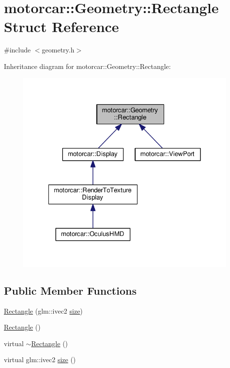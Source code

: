 \hypertarget{structmotorcar_1_1Geometry_1_1Rectangle}{\section{motorcar\-:\-:Geometry\-:\-:Rectangle Struct Reference}
\label{structmotorcar_1_1Geometry_1_1Rectangle}
}


{\ttfamily \#include $<$geometry.\-h$>$}



Inheritance diagram for motorcar\-:\-:Geometry\-:\-:Rectangle\-:
\nopagebreak
\begin{figure}[H]
\begin{center}
\leavevmode
\includegraphics[width=314pt]{structmotorcar_1_1Geometry_1_1Rectangle__inherit__graph}
\end{center}
\end{figure}
\subsection*{Public Member Functions}
\begin{DoxyCompactItemize}
\item 
\hyperlink{structmotorcar_1_1Geometry_1_1Rectangle_af8ec2dc746ed046045d14d31a4973b2e}{Rectangle} (glm\-::ivec2 \hyperlink{structmotorcar_1_1Geometry_1_1Rectangle_aef0385032dd32c2b2c762c08f1bfacf6}{size})
\item 
\hyperlink{structmotorcar_1_1Geometry_1_1Rectangle_a3a73665b3e36e9d73968ca77eece4552}{Rectangle} ()
\item 
virtual \hyperlink{structmotorcar_1_1Geometry_1_1Rectangle_aaba0c9f05f24482b1e668a1b63b35fa6}{$\sim$\-Rectangle} ()
\item 
virtual glm\-::ivec2 \hyperlink{structmotorcar_1_1Geometry_1_1Rectangle_aef0385032dd32c2b2c762c08f1bfacf6}{size} ()
\end{DoxyCompactItemize}
